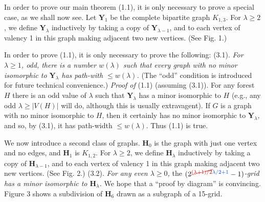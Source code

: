 
In order to prove our main theorem (1.1), it is only necessary to prove a
special case, as we shall now see. Let $\mathbf{Y}_1$ be the complete bipartite graph
$K_{1,3}$. For $\lambda\ge 2$, we define $\mathbf{Y}_\lambda$ inductively by taking a copy of $\mathbf{Y}_{\lambda-1}$, and to
each vertex of valency 1 in this graph making adjacent two new vertices.
(See Fig. 1.)

In order to prove (1.1), it is only necessary to prove the following:
\stmt
(3.1). \textit{For $\lambda\ge 1$, odd, there is a number $w(\lambda)$ such that every graph with
no minor isomorphic to $\mathbf{Y}_\lambda$ has path-with $\le w(\lambda)$.}
\stmt
(The ``odd'' condition is introduced for future technical convenience.)
\stmt
\textit{Proof of} (1.1) (assuming (3.1)). For any forest $H$ there is an odd value
of $\lambda$ such that $\mathbf{Y}_\lambda$ has a minor isomorphic to $H$ (e.g., any odd $\lambda\ge|V(H)|$ will
do, although this is usually extravagent). If $G$ is a graph with no minor
isomorphic to $H$, then it certainly has no minor isomorphic to $\mathbf{Y}_\lambda$, and so,
by (3.1), it has path-width $\le w(\lambda)$. Thus (1.1) is true.

We now introduce a second class of graphs. $\mathbf{H}_0$ is the graph with just one
vertex and no edges, and $\mathbf{H}_1$ is $K_{1,2}$. For $\lambda\ge 2$, we define $\mathbf{H}_\lambda$ inductively by
taking a copy of $\mathbf{H}_{\lambda-1}$, and to each vertex of valency 1 in this graph making
adjacent two new vertices. (See Fig. 2.)
\stmt
(3.2). \textit{For any even $\lambda\ge 0$,} the \textit{$(2^{\delm{(\lambda+1)/2}\fix{\lambda/2+1}}-1)$-grid has a minor isomorphic
to $\mathbf{H}_\lambda$.}
\stmt
{} We hope that a ``proof by
diagram'' is convincing. Figure 3 shows a subdivision of $\mathbf{H}_6$ drawn as a
subgraph of a 15-grid.

